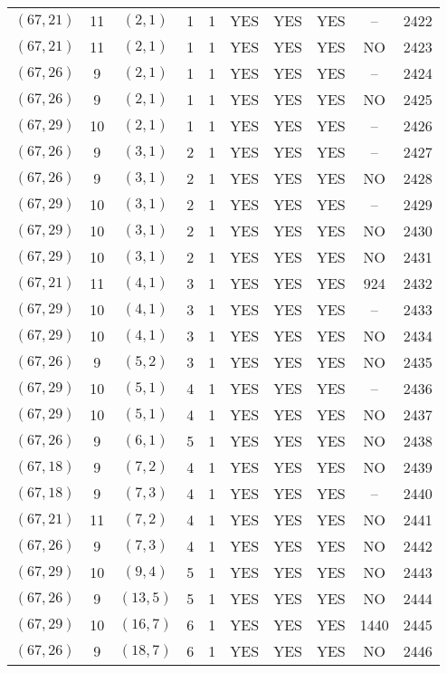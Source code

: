 \begin{longtable}{|c|c|c|c|c|c|c|c|c|c|}
$(67, 21)$ & 11 & $(2, 1)$ & 1 & 1 & YES & YES & YES & -- & 2422\\
$(67, 21)$ & 11 & $(2, 1)$ & 1 & 1 & YES & YES & YES & NO & 2423\\
$(67, 26)$ & 9 & $(2, 1)$ & 1 & 1 & YES & YES & YES & -- & 2424\\
$(67, 26)$ & 9 & $(2, 1)$ & 1 & 1 & YES & YES & YES & NO & 2425\\
$(67, 29)$ & 10 & $(2, 1)$ & 1 & 1 & YES & YES & YES & -- & 2426\\
$(67, 26)$ & 9 & $(3, 1)$ & 2 & 1 & YES & YES & YES & -- & 2427\\
$(67, 26)$ & 9 & $(3, 1)$ & 2 & 1 & YES & YES & YES & NO & 2428\\
$(67, 29)$ & 10 & $(3, 1)$ & 2 & 1 & YES & YES & YES & -- & 2429\\
$(67, 29)$ & 10 & $(3, 1)$ & 2 & 1 & YES & YES & YES & NO & 2430\\
$(67, 29)$ & 10 & $(3, 1)$ & 2 & 1 & YES & YES & YES & NO & 2431\\
$(67, 21)$ & 11 & $(4, 1)$ & 3 & 1 & YES & YES & YES & 924 & 2432\\
$(67, 29)$ & 10 & $(4, 1)$ & 3 & 1 & YES & YES & YES & -- & 2433\\
$(67, 29)$ & 10 & $(4, 1)$ & 3 & 1 & YES & YES & YES & NO & 2434\\
$(67, 26)$ & 9 & $(5, 2)$ & 3 & 1 & YES & YES & YES & NO & 2435\\
$(67, 29)$ & 10 & $(5, 1)$ & 4 & 1 & YES & YES & YES & -- & 2436\\
$(67, 29)$ & 10 & $(5, 1)$ & 4 & 1 & YES & YES & YES & NO & 2437\\
$(67, 26)$ & 9 & $(6, 1)$ & 5 & 1 & YES & YES & YES & NO & 2438\\
$(67, 18)$ & 9 & $(7, 2)$ & 4 & 1 & YES & YES & YES & NO & 2439\\
$(67, 18)$ & 9 & $(7, 3)$ & 4 & 1 & YES & YES & YES & -- & 2440\\
$(67, 21)$ & 11 & $(7, 2)$ & 4 & 1 & YES & YES & YES & NO & 2441\\
$(67, 26)$ & 9 & $(7, 3)$ & 4 & 1 & YES & YES & YES & NO & 2442\\
$(67, 29)$ & 10 & $(9, 4)$ & 5 & 1 & YES & YES & YES & NO & 2443\\
$(67, 26)$ & 9 & $(13, 5)$ & 5 & 1 & YES & YES & YES & NO & 2444\\
$(67, 29)$ & 10 & $(16, 7)$ & 6 & 1 & YES & YES & YES & 1440 & 2445\\
$(67, 26)$ & 9 & $(18, 7)$ & 6 & 1 & YES & YES & YES & NO & 2446\\

\end{longtable}
